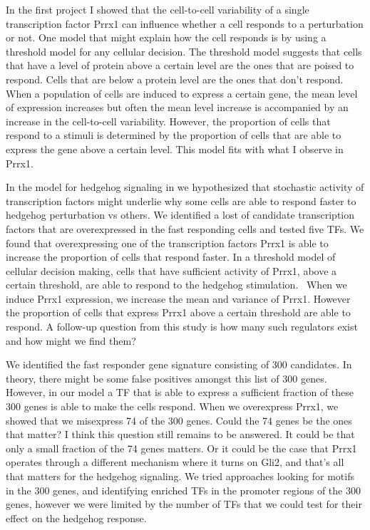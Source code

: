 In the first project I showed that the cell-to-cell variability of a single transcription factor Prrx1 can influence whether a cell responds to a perturbation or not. One model that might explain how the cell responds is by using a threshold model for any cellular decision. The threshold model suggests that cells that have a level of protein above a certain level are the ones that are poised to respond. Cells that are below a protein level are the ones that don't respond. When a population of cells are induced to express a certain gene, the mean level of expression increases but often the mean level increase is accompanied by an increase in the cell-to-cell variability. However, the proportion of cells that respond to a stimuli is determined by the proportion of cells that are able to express the gene above a certain level. This model fits with what I observe in Prrx1.

In the model for hedgehog signaling in \label{Chap:hedgehog} we hypothesized that stochastic activity of transcription factors might underlie why some cells are able to respond faster to hedgehog perturbation vs others. We identified a lost of candidate transcription factors that are overexpressed in the fast responding cells and tested five TFs. We found that overexpressing one of the transcription factors Prrx1 is able to increase the proportion of cells that respond faster. In a threshold model of cellular decision making, cells that have sufficient activity of Prrx1, above a certain threshold, are able to respond to the hedgehog stimulation.  When we induce Prrx1 expression, we increase the mean and variance of Prrx1. However the proportion of cells that express Prrx1 above a certain threshold are able to respond. A follow-up question from this study is how many such regulators exist and how might we find them?

We identified the fast responder gene signature consisting of 300 candidates. In theory, there might be some false positives amongst this list of 300 genes. However, in our model a TF that is able to express a sufficient fraction of these 300 genes is able to make the cells respond. When we overexpress Prrx1, we showed that we misexpress 74 of the 300 genes. Could the 74 genes be the ones that matter? I think this question still remains to be answered. It could be that only a small fraction of the 74 genes matters. Or it could be the case that Prrx1 operates through a different mechanism where it turns on Gli2, and that's all that matters for the hedgehog signaling. We tried approaches looking for motifs in the 300 genes, and identifying enriched TFs in the promoter regions of the 300 genes, however we were limited by the number of TFs that we could test for their effect on the hedgehog response. 




